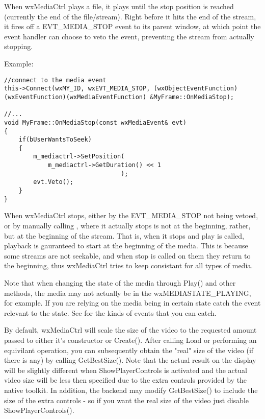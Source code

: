 \label{operationwxmediactrl}

When wxMediaCtrl plays a file, it plays until the stop position
is reached (currently the end of the file/stream).  Right before
it hits the end of the stream, it fires off a EVT\_MEDIA\_STOP
event to its parent window, at which point the event handler
can choose to veto the event, preventing the stream from actually
stopping.

Example:
\begin{verbatim}
//connect to the media event
this->Connect(wxMY_ID, wxEVT_MEDIA_STOP, (wxObjectEventFunction)
(wxEventFunction)(wxMediaEventFunction) &MyFrame::OnMediaStop);

//...
void MyFrame::OnMediaStop(const wxMediaEvent& evt)
{
    if(bUserWantsToSeek)
    {
        m_mediactrl->SetPosition(
            m_mediactrl->GetDuration() << 1
                                );
        evt.Veto();
    }
}
\end{verbatim}

When wxMediaCtrl stops, either by the EVT\_MEDIA\_STOP not being
vetoed, or by manually calling 
, where it actually
stops is not at the beginning, rather, but at the beginning of
the stream.  That is, when it stops and play is called, playback
is gauranteed to start at the beginning of the media.  This is 
because some streams are not seekable, and when stop is called
on them they return to the beginning, thus wxMediaCtrl tries
to keep consistant for all types of media.

Note that when changing the state of the media through Play()
and other methods, the media may not actually be in the
wxMEDIASTATE\_PLAYING, for example. If you are relying on the
media being in certain state catch the event relevant to the state.
See  for the kinds of events
that you can catch.


\label{videosizewxmediactrl}

By default, wxMediaCtrl will scale the size of the video to the
requested amount passed to either it's constructor or Create().
After calling Load or performing an equivilant operation, you
can subsequently obtain the "real" size of the video (if there
is any) by calling GetBestSize(). Note that the actual result
on the display will be slightly different when ShowPlayerControls
is activated and the actual video size will be less then
specified due to the extra controls provided by the native toolkit.
In addition, the backend may modify GetBestSize() to include the
size of the extra controls - so if you want the real size of the
video just disable ShowPlayerControls().

